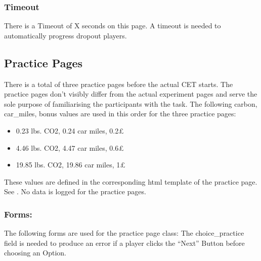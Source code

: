 \documentclass[letterpaper,10pt,english]{sphinxmanual}
\let\sphinxpxdimen\pdfpxdimen\else\newdimen\sphinxpxdimen
\begin{document}
\subsubsection{Timeout}
\label{\detokenize{pages:timeout}}
There is a Timeout of X seconds on this page. A timeout is needed to automatically progress dropout players.


\subsection{Practice Pages}
\label{\detokenize{pages:practice-pages}}
There is a total of three practice pages before the actual CET starts. The practice pages don’t visibly differ from
the actual experiment pages and serve the sole purpose of familiarising the participants with the task.
The following carbon, car\_miles, bonus values are used in this order for the three practice pages:
\begin{itemize}
\item {} 
0.23 lbs. CO2, 0.24 car miles, 0.2£

\item {} 
4.46 lbs. CO2, 4.47 car miles, 0.6£

\item {} 
19.85 lbs. CO2, 19.86 car miles, 1£

\end{itemize}

These values are defined in the corresponding html template of the practice page. See {\hyperref[\detokenize{templates:templates-ref}]{}}.
No data is logged for the practice pages.

\noindent{\hspace*{\fill}\sphinxincludegraphics[width=701\sphinxpxdimen,height=317\sphinxpxdimen]{{practice1}.png}\hspace*{\fill}}


\subsubsection{Forms:}
\label{\detokenize{pages:forms}}
The following forms are used for the practice page class:
The choice\_practice field is needed to produce an error if a player clicks the “Next” Button before choosing an Option.

\begin{sphinxVerbatim}[commandchars=\\\{\}]
 
      
      \PYG{p}{[}\PYG{p}{]}  
\end{sphinxVerbatim}
\end{document}
